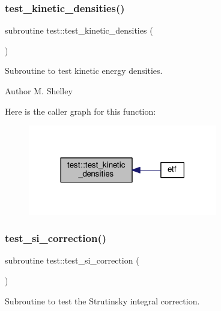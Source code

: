 \subsubsection{\texorpdfstring{test\+\_\+kinetic\+\_\+densities()}{test\_kinetic\_densities()}}
{\footnotesize\ttfamily subroutine test\+::test\+\_\+kinetic\+\_\+densities (\begin{DoxyParamCaption}{ }\end{DoxyParamCaption})}



Subroutine to test kinetic energy densities. 

\begin{DoxyAuthor}{Author}
M. Shelley 
\end{DoxyAuthor}
Here is the caller graph for this function\+:
\nopagebreak
\begin{figure}[H]
\begin{center}
\leavevmode
\includegraphics[width=234pt]{namespacetest_a377babe07d6ab6f0791233afee079582_icgraph}
\end{center}
\end{figure}
\mbox{\label{namespacetest_afde013e321ba30ada173fc343ca1fa6d}} 
\subsubsection{\texorpdfstring{test\+\_\+si\+\_\+correction()}{test\_si\_correction()}}
{\footnotesize\ttfamily subroutine test\+::test\+\_\+si\+\_\+correction (\begin{DoxyParamCaption}{ }\end{DoxyParamCaption})}



Subroutine to test the Strutinsky integral correction. 

